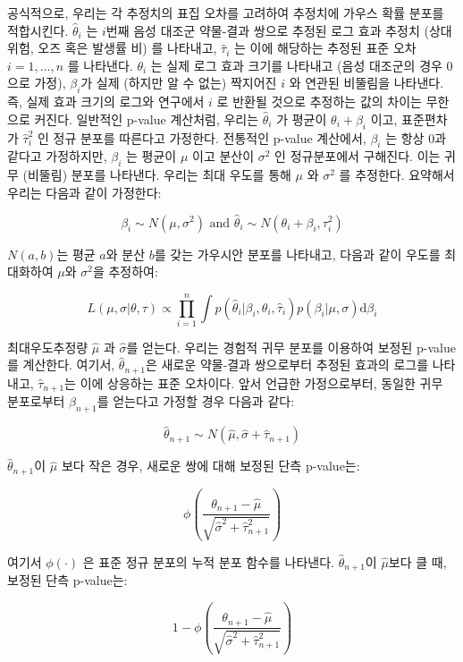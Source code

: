\documentclass[10.5pt]{book}
\theoremstyle{definition}
\theoremstyle{definition}
\theoremstyle{definition}
\theoremstyle{remark}
\begin{document}
공식적으로, 우리는 각 추정치의 표집 오차를 고려하여 추정치에 가우스 확률
분포를 적합시킨다. \(\hat{\theta}_i\) 는 \(i\)번째 음성 대조군 약물-결과
쌍으로 추정된 로그 효과 추정치 (상대 위험, 오즈 혹은 발생률 비) 를
나타내고, \(\hat{\tau}_i\) 는 이에 해당하는 추정된 표준 오차
\(i=1,\ldots,n\) 를 나타낸다. \(\theta_i\) 는 실제 로그 효과 크기를
나타내고 (음성 대조군의 경우 0으로 가정), \(\beta_i\)가 실제 (하지만 알
수 없는) 짝지어진 \(i\) 와 연관된 비뚤림을 나타낸다. 즉, 실제 효과
크기의 로그와 연구에서 \(i\) 로 반환될 것으로 추정하는 값의 차이는
무한으로 커진다. 일반적인 p-value 계산처럼, 우리는 \(\hat{\theta}_i\) 가
평균이 \(\theta_i + \beta_i\) 이고, 표준편차가 \(\hat{\tau}_i^2\) 인
정규 분포를 따른다고 가정한다. 전통적인 p-value 계산에서, \(\beta_i\) 는
항상 0과 같다고 가정하지만, \(\beta_i\) 는 평균이 \(\mu\) 이고 분산이
\(\sigma^2\) 인 정규분포에서 구해진다. 이는 귀무 (비뚤림) 분포를
나타낸다. 우리는 최대 우도를 통해 \(\mu\) 와 \(\sigma^2\) 를 추정한다.
요약해서 우리는 다음과 같이 가정한다:

\[\beta_i \sim N(\mu,\sigma^2) \text{  and  } \hat{\theta}_i \sim N(\theta_i + \beta_i, \tau_i^2)\]

\(N(a,b)\)는 평균 \(a\)와 분산 \(b\)를 갖는 가우시안 분포를 나타내고,
다음과 같이 우도를 최대화하여 \(\mu\)와 \(\sigma^2\)을 추정하여:

\[L(\mu, \sigma | \theta, \tau) \propto \prod_{i=1}^{n}\int p(\hat{\theta}_i|\beta_i, \theta_i, \hat{\tau}_i)p(\beta_i|\mu, \sigma) \text{d}\beta_i\]

최대우도추정량 \(\hat{\mu}\) 과 \(\hat{\sigma}\)를 얻는다. 우리는 경험적
귀무 분포를 이용하여 보정된 p-value를 계산한다. 여기서,
\(\hat{\theta}_{n+1}\)은 새로운 약물-결과 쌍으로부터 추정된 효과의
로그를 나타내고, \(\hat{\tau}_{n+1}\)는 이에 상응하는 표준 오차이다.
앞서 언급한 가정으로부터, 동일한 귀무 분포로부터 \(\beta_{n+1}\)를
얻는다고 가정할 경우 다음과 같다:

\[\hat{\theta}_{n+1} \sim N(\hat{\mu}, \hat{\sigma} + \hat{\tau}_{n+1})\]

\(\hat{\theta}_{n+1}\)이 \(\hat{\mu}\) 보다 작은 경우, 새로운 쌍에 대해
보정된 단측 p-value는:

\[\phi\left(\frac{\theta_{n+1} - \hat{\mu}}{\sqrt{\hat{\sigma}^2 + \hat{\tau}_{n+1}^2}}\right)\]

여기서 \(\phi(\cdot)\) 은 표준 정규 분포의 누적 분포 함수를 나타낸다.
\(\hat{\theta}_{n+1}\)이 \(\hat{\mu}\)보다 클 때, 보정된 단측 p-value는:

\[1-\phi\left(\frac{\theta_{n+1} - \hat{\mu}}{\sqrt{\hat{\sigma}^2 + \hat{\tau}_{n+1}^2}}\right)\]
\end{document}
